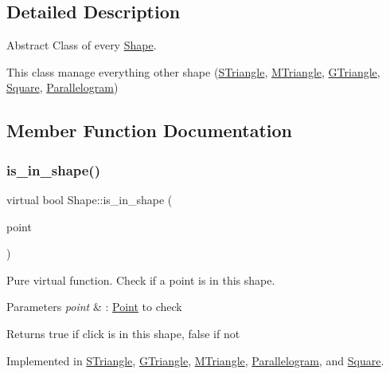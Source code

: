 \subsection{Detailed Description}
Abstract Class of every \hyperlink{classShape}{Shape}. 

This class manage everything other shape (\hyperlink{classSTriangle}{S\+Triangle}, \hyperlink{classMTriangle}{M\+Triangle}, \hyperlink{classGTriangle}{G\+Triangle}, \hyperlink{classSquare}{Square}, \hyperlink{classParallelogram}{Parallelogram}) 

\subsection{Member Function Documentation}
\mbox{\label{classShape_abcce23128cd35989468a88a7194152af}} 
\subsubsection{\texorpdfstring{is\+\_\+in\+\_\+shape()}{is\_in\_shape()}}
{\footnotesize\ttfamily virtual bool Shape\+::is\+\_\+in\+\_\+shape (\begin{DoxyParamCaption}\item[{\hyperlink{classPoint}{Point}$<$ double $>$}]{point }\end{DoxyParamCaption})\hspace{0.3cm}{\ttfamily [pure virtual]}}



Pure virtual function. Check if a point is in this shape. 


\begin{DoxyParams}{Parameters}
{\em point} & \+: \hyperlink{classPoint}{Point} to check \\
\hline
\end{DoxyParams}
\begin{DoxyReturn}{Returns}
true if click is in this shape, false if not 
\end{DoxyReturn}


Implemented in \hyperlink{classSTriangle_a122eba5ec56c5f1707d53aea5be0b69c}{S\+Triangle}, \hyperlink{classGTriangle_a7e5d4eefbb2e42b9c3142096a23dcb19}{G\+Triangle}, \hyperlink{classMTriangle_a8d3d737a903823bf1a631cbb004a799c}{M\+Triangle}, \hyperlink{classParallelogram_a9ba441d86d6311bba489e998c87dddf6}{Parallelogram}, and \hyperlink{classSquare_a18b130131d969c53f3dfbe2b753a28d4}{Square}.

